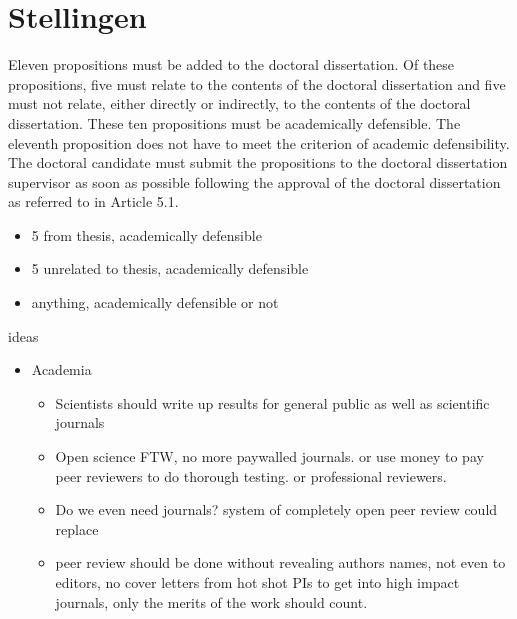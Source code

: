 \chapter*{Stellingen}

Eleven propositions must be added to the doctoral dissertation. Of these propositions,
five must relate to the contents of the doctoral dissertation and five must not relate,
either directly or indirectly, to the contents of the doctoral dissertation. These ten
propositions must be academically defensible. The eleventh proposition does not have
to meet the criterion of academic defensibility. The doctoral candidate must submit the
propositions to the doctoral dissertation supervisor as soon as possible following the
approval of the doctoral dissertation as referred to in Article 5.1.

\begin{itemize}
\item 5 from thesis, academically defensible
\item 5 unrelated to thesis, academically defensible
\item anything, academically defensible or not
\end{itemize}


ideas

\begin{itemize}
\item Academia
    \begin{itemize}
     \item Scientists should write up results for general public as well as scientific journals
     \item Open science FTW, no more paywalled journals. or use money to pay peer reviewers to do thorough testing. or professional reviewers.
     \item Do we even need journals? system of completely open peer review could replace
     \item peer review should be done without revealing authors names, not even to editors, no cover letters from hot shot PIs to get into high impact journals, only the merits of the work should count.
    \end{itemize}
\end{itemize}

